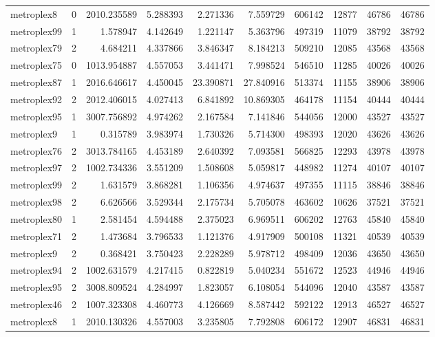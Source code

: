 \begin{longtable}{|l|r|r|r|r|r|r|r|r|r|}
metroplex8 & 0 & 2010.235589 & 5.288393 & 2.271336 & 7.559729 & 606142 & 12877 & 46786 & 46786 \\
metroplex99 & 1 & 1.578947 & 4.142649 & 1.221147 & 5.363796 & 497319 & 11079 & 38792 & 38792 \\
metroplex79 & 2 & 4.684211 & 4.337866 & 3.846347 & 8.184213 & 509210 & 12085 & 43568 & 43568 \\
metroplex75 & 0 & 1013.954887 & 4.557053 & 3.441471 & 7.998524 & 546510 & 11285 & 40026 & 40026 \\
metroplex87 & 1 & 2016.646617 & 4.450045 & 23.390871 & 27.840916 & 513374 & 11155 & 38906 & 38906 \\
metroplex92 & 2 & 2012.406015 & 4.027413 & 6.841892 & 10.869305 & 464178 & 11154 & 40444 & 40444 \\
metroplex95 & 1 & 3007.756892 & 4.974262 & 2.167584 & 7.141846 & 544056 & 12000 & 43527 & 43527 \\
metroplex9 & 1 & 0.315789 & 3.983974 & 1.730326 & 5.714300 & 498393 & 12020 & 43626 & 43626 \\
metroplex76 & 2 & 3013.784165 & 4.453189 & 2.640392 & 7.093581 & 566825 & 12293 & 43978 & 43978 \\
metroplex97 & 2 & 1002.734336 & 3.551209 & 1.508608 & 5.059817 & 448982 & 11274 & 40107 & 40107 \\
metroplex99 & 2 & 1.631579 & 3.868281 & 1.106356 & 4.974637 & 497355 & 11115 & 38846 & 38846 \\
metroplex98 & 2 & 6.626566 & 3.529344 & 2.175734 & 5.705078 & 463602 & 10626 & 37521 & 37521 \\
metroplex80 & 1 & 2.581454 & 4.594488 & 2.375023 & 6.969511 & 606202 & 12763 & 45840 & 45840 \\
metroplex71 & 2 & 1.473684 & 3.796533 & 1.121376 & 4.917909 & 500108 & 11321 & 40539 & 40539 \\
metroplex9 & 2 & 0.368421 & 3.750423 & 2.228289 & 5.978712 & 498409 & 12036 & 43650 & 43650 \\
metroplex94 & 2 & 1002.631579 & 4.217415 & 0.822819 & 5.040234 & 551672 & 12523 & 44946 & 44946 \\
metroplex95 & 2 & 3008.809524 & 4.284997 & 1.823057 & 6.108054 & 544096 & 12040 & 43587 & 43587 \\
metroplex46 & 2 & 1007.323308 & 4.460773 & 4.126669 & 8.587442 & 592122 & 12913 & 46527 & 46527 \\
metroplex8 & 1 & 2010.130326 & 4.557003 & 3.235805 & 7.792808 & 606172 & 12907 & 46831 & 46831 \\

\end{longtable}

